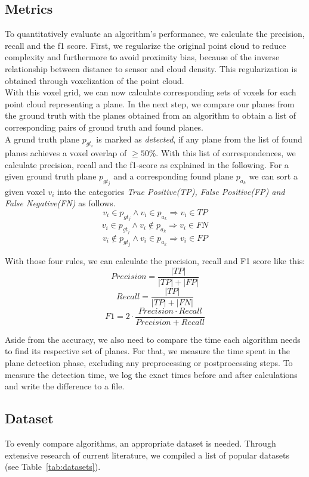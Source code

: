 \documentclass[main.tex]{subfiles}
\begin{document}
\subsection{Metrics}
To quantitatively evaluate an algorithm's performance, we calculate the precision, recall and the f1 score.
First, we regularize the original point cloud to reduce complexity and furthermore to avoid proximity bias, because of the inverse relationship
between distance to sensor and cloud density. This regularization is obtained through voxelization of the point cloud.\\
With this voxel grid, we can now calculate corresponding sets of voxels for each point cloud representing a plane.
In the next step, we compare our planes from the ground truth with the planes obtained from an algorithm to obtain a list of corresponding pairs
of ground truth and found planes.\\
A grund truth plane $p_{gt_i}$ is marked as \textit{detected}, if any plane from the list of found planes achieves a voxel overlap of $\geq 50\%$.
With this list of correspondences, we calculate precision, recall and the f1-score as explained in the following.
For a given ground truth plane $p_{gt_j}$ and a corresponding found plane $p_{a_k}$ we can sort a given voxel $v_i$ into the categories
\textit{True Positive(TP), False Positive(FP) and False Negative(FN)} as follows.
$$v_i \in p_{gt_j} \land v_i \in p_{a_k} \Rightarrow v_{i} \in TP$$
$$v_i \in p_{gt_j} \land v_i \notin p_{a_k} \Rightarrow v_{i} \in FN$$
$$v_i \notin p_{gt_j} \land v_i \in p_{a_k} \Rightarrow v_{i} \in FP$$

With those four rules, we can calculate the precision, recall and F1 score like this:
$$Precision = \frac{|TP|}{|TP|+|FP|}$$
$$Recall = \frac{|TP|}{|TP|+|FN|}$$
$$F1 = 2 \cdot\frac{Precision\cdot Recall}{Precision + Recall}$$

Aside from the accuracy, we also need to compare the time each algorithm needs to find its respective set of planes.
For that, we measure the time spent in the plane detection phase, excluding any preprocessing or postprocessing steps.
To measure the detection time, we log the exact times before and after calculations and write the difference to a file.\\

\subsection{Dataset}
To evenly compare algorithms, an appropriate dataset is needed. Through extensive research of current literature, we compiled a list of popular datasets (see Table~\ref{tab:datasets}). 
\end{document}
